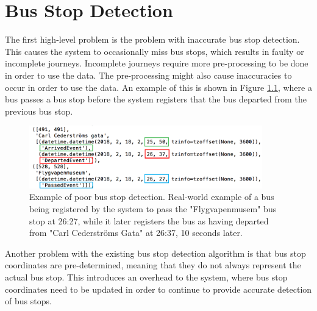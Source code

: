 \chapter{Bus Stop Detection}
\label{cha:bus-stop-detection}

The first high-level problem is the problem with inaccurate bus stop detection.
This causes the system to occasionally miss bus stops, which results in faulty or incomplete journeys.
Incomplete journeys require more pre-processing to be done in order to use the data.
The pre-processing might also cause inaccuracies to occur in order to use the data.
An example of this is shown in Figure \ref{fig:passed-before-departed}, where a bus passes a bus stop before the system registers that the bus departed from the previous bus stop.

\begin{figure}[ht!]
    \centering
    \includegraphics[width=0.9\textwidth]{figures/bad_timing}
    \caption[Example of poor bus stop detection]%
    {\small Example of poor bus stop detection. Real-world example of a bus being registered by the system to pass the "Flygvapenmusem" bus stop at 26:27,
    while it later registers the bus as having departed from "Carl Cederströms Gata" at 26:37, 10 seconds later.
    }
    \label{fig:passed-before-departed}
\end{figure}

Another problem with the existing bus stop detection algorithm is that bus stop coordinates are pre-determined, meaning that they do not always represent the actual bus stop.
This introduces an overhead to the system, where bus stop coordinates need to be updated in order to continue to provide accurate detection of bus stops.

